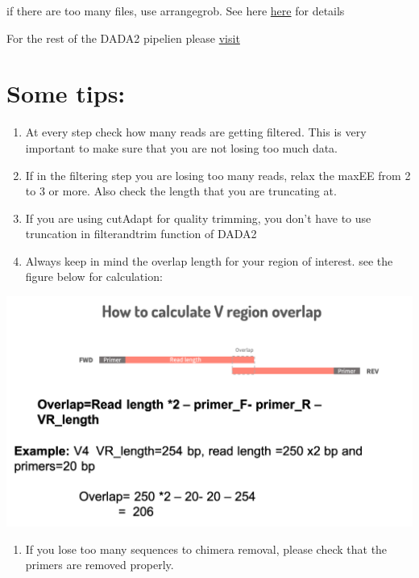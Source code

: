 \documentclass[
]{book}
\providecommand{\tightlist}{%
  \setlength{\itemsep}{0pt}\setlength{\parskip}{0pt}}
\begin{document}
if there are too many files, use arrangegrob. See here \href{https://cran.r-project.org/web/packages/gridExtra/vignettes/arrangeGrob.html}{here} for details

For the rest of the DADA2 pipelien please \href{https://benjjneb.github.io/dada2/tutorial.html}{visit}

\hypertarget{some-tips}{%
\section{Some tips:}\label{some-tips}}

\begin{enumerate}
\def\labelenumi{\arabic{enumi}.}
\item
  At every step check how many reads are getting filtered. This is very important to make sure that you are not losing too much data.
\item
  If in the filtering step you are losing too many reads, relax the maxEE from 2 to 3 or more. Also check the length that you are truncating at.
\item
  If you are using cutAdapt for quality trimming, you don't have to use truncation in filterandtrim function of DADA2
\item
  Always keep in mind the overlap length for your region of interest. see the figure below for calculation:
\end{enumerate}

\includegraphics{overlap.png}

\begin{enumerate}
\def\labelenumi{\arabic{enumi}.}
\setcounter{enumi}{4}
\tightlist
\item
  If you lose too many sequences to chimera removal, please check that the primers are removed properly.
\end{enumerate}
\end{document}
